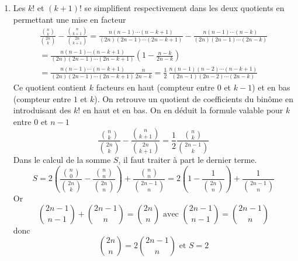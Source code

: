 \begin{enumerate}
\item Les $k!$ et $(k+1)!$ se simplifient respectivement dans les deux quotients en permettant une mise en facteur
  \begin{multline*}
  \frac{\binom{n}{k}}{\binom{2n}{k}}-\frac{\binom{n}{k+1}}{\binom{2n}{k+1}}
  = \frac{n(n-1)\cdots (n-k+1)}{(2n)(2n-1)\cdots  (2n-k+1)} - \frac{n(n-1)\cdots (n-k)}{(2n)(2n-1)\cdots  (2n-k)}\\
  = \frac{n(n-1)\cdots (n-k+1)}{(2n)(2n-1)\cdots  (2n-k+1)}(1-\frac{n-k}{2n-k})\\
  = \frac{n (n-1)\cdots (n-k+1)}{(2n)(2n-1)\cdots (2n-k+1)}\frac{n}{2n-k}
  = \frac{1}{2}\,\frac{n(n-1)(n-2)\cdots(n-k+1)}{(2n-1)(2n-2)\cdots(2n-k)}
  \end{multline*}
  Ce quotient contient $k$ facteurs en haut (compteur entre $0$ et $k-1$) et en bas (compteur entre $1$ et $k$). On retrouve un quotient de coefficients du bin{\^o}me en introduisant des $k!$ en haut et en bas. On en d{\'e}duit la formule valable pour $k$ entre 0 et $n-1$
  \begin{displaymath}
  \frac{\binom{n}{k}}{\binom{2n}{k}}-\frac{\binom{n}{k+1}}{\binom{2n}{k+1}}
  =\frac{1}{2}\frac{\binom{n}{k}}{\binom{2n-1}{k}}
  \end{displaymath}
  Dans le calcul de la somme $S$, il faut traiter {\`a} part le dernier terme.
  \begin{displaymath}
  S =
  2\left( \frac{\binom{n}{0}}{\binom{2n}{k}}-\frac{\binom{n}{n}}{\binom{2n}{n}}\right) 
+\frac{\binom{n}{n}}{\binom{2n-1}{n}}
  = 2\left( 1-\frac{1}{\binom{2n}{n}}\right) +\frac{1}{\binom{2n-1}{n}}
  \end{displaymath}
Or  
\begin{displaymath}
 \binom{2n-1}{n-1}+\binom{2n-1}{n}=\binom{2n}{n}
\text{ avec }
\binom{2n-1}{n-1}= \binom{2n-1}{n}
\end{displaymath}
donc
\begin{displaymath}
 \binom{2n}{n} = 2 \binom{2n-1}{n}\text{ et } S=2 
\end{displaymath}

\end{enumerate}
